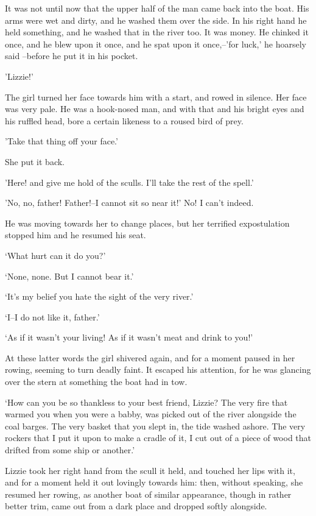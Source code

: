 It was not until now that the upper half of the man came back into
the boat. His arms were wet and dirty, and he washed them over
the side. In his right hand he held something, and he washed that
in the river too.
It was money.
He chinked it once, and he blew
upon it once, and he spat upon it once,--'for luck,' he hoarsely said
--before he put it in his pocket.

'Lizzie!'

The girl turned her face towards him with a start, and rowed in silence.
Her face was very pale.
He was a hook-nosed man, and
with that and his bright eyes and his ruffled head, bore a certain
likeness to a roused bird of prey.

'Take that thing off your face.'

She put it back.

'Here! and give me hold of the sculls. I'll take the rest of the spell.'

'No, no, father! Father!--I cannot sit so near it!' No!
I can't indeed.

He was moving towards her to change places, but her terrified
expostulation stopped him and he resumed his seat.

‘What hurt can it do you?’

‘None, none. But I cannot bear it.’

‘It’s my belief you hate the sight of the very river.’

‘I--I do not like it, father.’

‘As if it wasn’t your living! As if it wasn’t meat and drink to you!’

At these latter words the girl shivered again, and for a moment paused
in her rowing, seeming to turn deadly faint. It escaped his attention,
for he was glancing over the stern at something the boat had in tow.

‘How can you be so thankless to your best friend, Lizzie? The very
fire that warmed you when you were a babby, was picked out of the river
alongside the coal barges. The very basket that you slept in, the tide
washed ashore. The very rockers that I put it upon to make a cradle
of it, I cut out of a piece of wood that drifted from some ship or
another.’

Lizzie took her right hand from the scull it held, and touched her
lips with it, and for a moment held it out lovingly towards him: then,
without speaking, she resumed her rowing, as another boat of similar
appearance, though in rather better trim, came out from a dark place and
dropped softly alongside.

